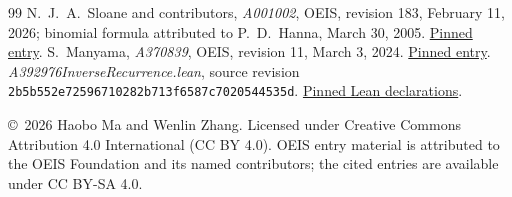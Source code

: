 \documentclass[10pt]{article}
\begin{document}
\begin{thebibliography}{99}
N.\ J.\ A.\ Sloane and contributors, \emph{A001002}, OEIS,
revision 183, February 11, 2026; binomial formula attributed to P.\ D.\ Hanna,
March 30, 2005.
\href{https://github.com/oeis/oeisdata/blob/4c6abcdf8b00fd262030066ebfced671457e5b43/seq/A001/A001002.seq}{Pinned entry}.
S.\ Manyama, \emph{A370839}, OEIS,
revision 11, March 3, 2024.
\href{https://github.com/oeis/oeisdata/blob/4c6abcdf8b00fd262030066ebfced671457e5b43/seq/A370/A370839.seq}{Pinned entry}.
\emph{A392976InverseRecurrence.lean}, source revision\\
\texttt{2b5b552e72596710282b713f6587c7020544535d}.
\href{https://github.com/the-omega-institute/trureturing/blob/2b5b552e72596710282b713f6587c7020544535d/D5/S1/Recurrence/Algebraic/A392976InverseRecurrence.lean}{Pinned Lean declarations}.
\end{thebibliography}

\medskip\noindent\footnotesize
\copyright\ 2026 Haobo Ma and Wenlin Zhang.
Licensed under Creative Commons Attribution 4.0 International (CC BY 4.0).
OEIS entry material is attributed to the OEIS Foundation and its named
contributors; the cited entries are available under CC BY-SA 4.0.
\end{document}
